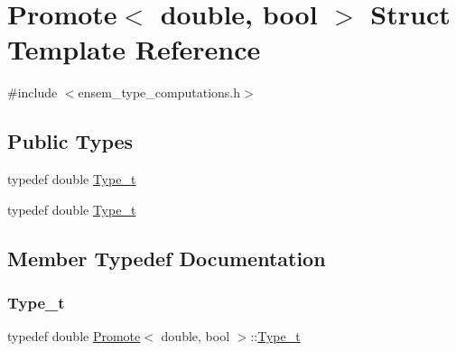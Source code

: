 \hypertarget{structPromote_3_01double_00_01bool_01_4}{}\section{Promote$<$ double, bool $>$ Struct Template Reference}
\label{structPromote_3_01double_00_01bool_01_4}


{\ttfamily \#include $<$ensem\+\_\+type\+\_\+computations.\+h$>$}

\subsection*{Public Types}
\begin{DoxyCompactItemize}
\item 
typedef double \mbox{\hyperlink{structPromote_3_01double_00_01bool_01_4_a0daa22cf2a9d3b7070f5d6945d770c68}{Type\+\_\+t}}
\item 
typedef double \mbox{\hyperlink{structPromote_3_01double_00_01bool_01_4_a0daa22cf2a9d3b7070f5d6945d770c68}{Type\+\_\+t}}
\end{DoxyCompactItemize}


\subsection{Member Typedef Documentation}
\mbox{\label{structPromote_3_01double_00_01bool_01_4_a0daa22cf2a9d3b7070f5d6945d770c68}} 
\subsubsection{\texorpdfstring{Type\_t}{Type\_t}\hspace{0.1cm}{\footnotesize\ttfamily [1/2]}}
{\footnotesize\ttfamily typedef double \mbox{\hyperlink{structPromote}{Promote}}$<$ double, bool $>$\+::\mbox{\hyperlink{structPromote_3_01double_00_01bool_01_4_a0daa22cf2a9d3b7070f5d6945d770c68}{Type\+\_\+t}}}

\mbox{\label{structPromote_3_01double_00_01bool_01_4_a0daa22cf2a9d3b7070f5d6945d770c68}} 
